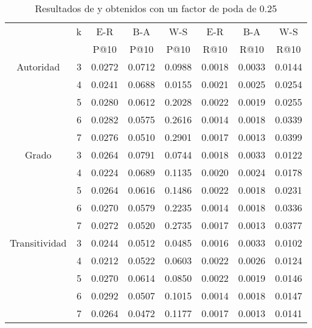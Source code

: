\begin{table}[htbp]
\begin{center}
\begin{tabular}{|l|r|r|r|r|r|r|r|}
\hline
\multicolumn{ 1}{|l|}{} & \multicolumn{ 1}{c|}{k} & \multicolumn{ 1}{c|}{E-R} & \multicolumn{ 1}{c|}{B-A} & \multicolumn{ 1}{c|}{W-S} & \multicolumn{ 1}{c|}{E-R} & \multicolumn{ 1}{c|}{B-A} & \multicolumn{ 1}{c|}{W-S} \\
\multicolumn{ 1}{|l|}{} & \multicolumn{ 1}{l|}{} & \multicolumn{ 1}{c|}{P@10} & \multicolumn{ 1}{c|}{P@10} & \multicolumn{ 1}{c|}{P@10} & \multicolumn{ 1}{c|}{R@10} & \multicolumn{ 1}{c|}{R@10} & \multicolumn{ 1}{c|}{R@10} \\
\hline \hline
\multicolumn{ 1}{|c|}{Autoridad} & 3 & 0.0272 & 0.0712 & 0.0988 & 0.0018 & 0.0033 & 0.0144 \\ \cline{ 2- 8}
\multicolumn{ 1}{|l|}{} & 4 & 0.0241 & 0.0688 & 0.0155 & 0.0021 & 0.0025 & 0.0254 \\ \cline{ 2- 8}
\multicolumn{ 1}{|l|}{} & 5 & 0.0280 & 0.0612 & 0.2028 & 0.0022 & 0.0019 & 0.0255 \\ \cline{ 2- 8}
\multicolumn{ 1}{|l|}{} & 6 & 0.0282 & 0.0575 & 0.2616 & 0.0014 & 0.0018 & 0.0339 \\ \cline{ 2- 8}
\multicolumn{ 1}{|l|}{} & 7 & 0.0276 & 0.0510 & 0.2901 & 0.0017 & 0.0013 & 0.0399 \\ \hline \hline
\multicolumn{ 1}{|c|}{Grado} & 3 & 0.0264 & 0.0791 & 0.0744 & 0.0018 & 0.0033 & 0.0122 \\ \cline{ 2- 8}
\multicolumn{ 1}{|l|}{} & 4 & 0.0224 & 0.0689 & 0.1135 & 0.0020 & 0.0024 & 0.0178 \\ \cline{ 2- 8}
\multicolumn{ 1}{|l|}{} & 5 & 0.0264 & 0.0616 & 0.1486 & 0.0022 & 0.0018 & 0.0231 \\ \cline{ 2- 8}
\multicolumn{ 1}{|l|}{} & 6 & 0.0270 & 0.0579 & 0.2235 & 0.0014 & 0.0018 & 0.0336 \\ \cline{ 2- 8}
\multicolumn{ 1}{|l|}{} & 7 & 0.0272 & 0.0520 & 0.2735 & 0.0017 & 0.0013 & 0.0377 \\ \hline \hline
\multicolumn{ 1}{|c|}{Transitividad} & 3 & 0.0244 & 0.0512 & 0.0485 & 0.0016 & 0.0033 & 0.0102 \\ \cline{ 2- 8}
\multicolumn{ 1}{|l|}{} & 4 & 0.0212 & 0.0522 & 0.0603 & 0.0022 & 0.0026 & 0.0124 \\ \cline{ 2- 8}
\multicolumn{ 1}{|l|}{} & 5 & 0.0270 & 0.0614 & 0.0850 & 0.0022 & 0.0019 & 0.0146 \\ \cline{ 2- 8}
\multicolumn{ 1}{|l|}{} & 6 & 0.0292 & 0.0507 & 0.1015 & 0.0014 & 0.0018 & 0.0147 \\ \cline{ 2- 8}
 & 7 & 0.0264 & 0.0472 & 0.1177 & 0.0017 & 0.0013 & 0.0141 \\ \hline
\end{tabular}
\caption{Resultados de  y  obtenidos con un factor de poda de 0.25}
\label{tbl-pr25}
\end{center}
\end{table}
